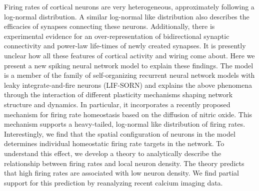 \documentclass[10pt,letterpaper]{article}
\begin{document}
%
Firing rates of cortical neurons are very heterogeneous, approximately following a log-normal distribution. A similar log-normal like distribution also describes the efficacies of synapses connecting these neurons. Additionally, there is experimental evidence for an over-representation of bidirectional synaptic connectivity and power-law life-times of newly created synapses. It is presently unclear how all these features of cortical activity and wiring come about. Here we present a new spiking neural network model to explain these findings. The model is a member of the family of self-organizing recurrent neural network models with leaky integrate-and-fire neurons (LIF-SORN) and explains the above phenomena through the interaction of different plasticity mechanisms shaping network structure and dynamics. In particular, it incorporates a recently proposed mechanism for firing rate homeostasis based on the diffusion of nitric oxide. This mechanism supports a heavy-tailed, log-normal like distribution of firing rates. Interestingly, we find that the spatial configuration of neurons in the model determines individual homeostatic firing rate targets in the network. To understand this effect, we develop a theory to analytically describe the relationship between firing rates and local neuron density. The theory predicts that high firing rates are associated with low neuron density. We find partial support for this prediction by reanalyzing recent calcium imaging data.

\newpage

\end{document}
